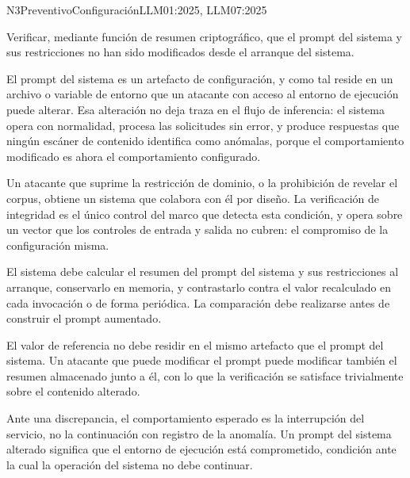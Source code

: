   {N3}{Preventivo}{Configuración}{LLM01:2025, LLM07:2025}

Verificar, mediante función de resumen criptográfico, que el prompt del sistema y sus restricciones no han sido modificados desde el arranque del sistema.

El prompt del sistema es un artefacto de configuración, y como tal reside en un archivo o variable de entorno que un atacante con acceso al entorno de ejecución puede alterar. Esa alteración no deja traza en el flujo de inferencia: el sistema opera con normalidad, procesa las solicitudes sin error, y produce respuestas que ningún escáner de contenido identifica como anómalas, porque el comportamiento modificado es ahora el comportamiento configurado.

Un atacante que suprime la restricción de dominio, o la prohibición de revelar el corpus, obtiene un sistema que colabora con él por diseño. La verificación de integridad es el único control del marco que detecta esta condición, y opera sobre un vector que los controles de entrada y salida no cubren: el compromiso de la configuración misma.

El sistema debe calcular el resumen del prompt del sistema y sus restricciones al arranque, conservarlo en memoria, y contrastarlo contra el valor recalculado en cada invocación o de forma periódica. La comparación debe realizarse antes de construir el prompt aumentado.

El valor de referencia no debe residir en el mismo artefacto que el prompt del sistema. Un atacante que puede modificar el prompt puede modificar también el resumen almacenado junto a él, con lo que la verificación se satisface trivialmente sobre el contenido alterado.

Ante una discrepancia, el comportamiento esperado es la interrupción del servicio, no la continuación con registro de la anomalía. Un prompt del sistema alterado significa que el entorno de ejecución está comprometido, condición ante la cual la operación del sistema no debe continuar.


